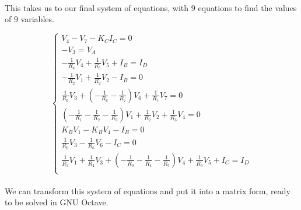 \paragraph{}
This takes us to our final system of equations, with 9 equations to find the values of 9 variables.

\[
\left\{\begin{matrix}
V_{4} - V_{7} -K_{C}I_{C}=0\\

-V_{3}=V_{A}\\ 

-\frac{1}{R_{4}}V_{4}+\frac{1}{R_{5}}V_{5}+I_{B}=I_D\\

-\frac{1}{R_{2}}V_{1}+\frac{1}{R_{2}}V_{2}-I_{B}=0\\ 

\frac{1}{R_{6}}V_{3}+(-\frac{1}{R_{6}}-\frac{1}{R_{7}})V_{6}+\frac{1}{R_{7}}V_{7}=0\\ 

(-\frac{1}{R_{1}}-\frac{1}{R_{2}}-\frac{1}{R_{3}})V_{1} + \frac{1}{R_{2}}V_{2}+\frac{1}{R_{3}}V_{4}=0\\

K_{B}V_{1}-K_{B}V_{4}-I_{B}=0\\

\frac{1}{R_{6}}V_{3}-\frac{1}{R_{6}}V_{6}-I_{C}=0\\ 

\frac{1}{R_{3}}V_{1}+\frac{1}{R_{4}}V_{3}+(-\frac{1}{R_{3}}-\frac{1}{R_{4}}-\frac{1}{R_{5}})V_{4}+\frac{1}{R_{5}}V_{5}+I_C = I_D\\

\end{matrix}\right.
\]

\paragraph{}
We can transform this system of equations and put it into a matrix form, ready to be solved in GNU Octave.

